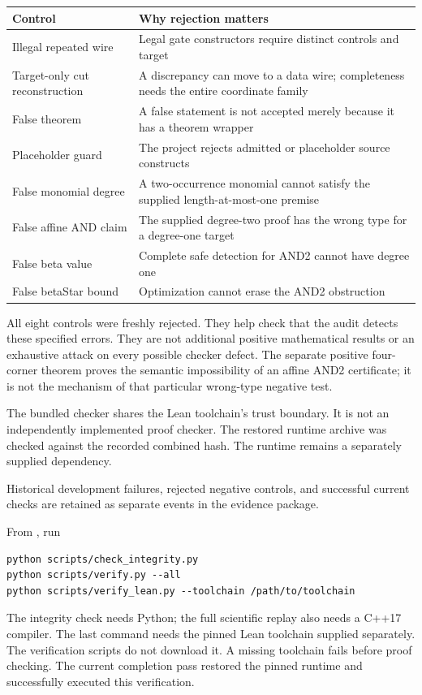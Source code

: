 \begin{tabularx}{\textwidth}{@{}>{\raggedright\arraybackslash}p{2.05in}>{\raggedright\arraybackslash}X@{}}\toprule
Control & Why rejection matters\\\midrule
Illegal repeated wire & Legal gate constructors require distinct controls and target\\
Target-only cut reconstruction & A discrepancy can move to a data wire; completeness needs the entire coordinate family\\
False theorem & A false statement is not accepted merely because it has a theorem wrapper\\
Placeholder guard & The project rejects admitted or placeholder source constructs\\
False monomial degree & A two-occurrence monomial cannot satisfy the supplied length-at-most-one premise\\
False affine AND claim & The supplied degree-two proof has the wrong type for a degree-one target\\
False beta value & Complete safe detection for AND2 cannot have degree one\\
False betaStar bound & Optimization cannot erase the AND2 obstruction\\\bottomrule
\end{tabularx}

All eight controls were freshly rejected. They help check that the audit detects these specified errors. They are not additional positive mathematical results or an exhaustive attack on every possible checker defect.
The separate positive four-corner theorem proves the semantic impossibility
of an affine AND2 certificate; it is not the mechanism of that particular
wrong-type negative test.

The bundled checker shares the Lean toolchain's trust boundary. It is not an independently implemented proof checker. The restored runtime archive was checked against the recorded combined hash. The runtime remains a separately supplied dependency.

Historical development failures, rejected negative controls, and successful current checks are retained as separate events in the evidence package.

From , run
\begin{lstlisting}
python scripts/check_integrity.py
python scripts/verify.py --all
python scripts/verify_lean.py --toolchain /path/to/toolchain
\end{lstlisting}
The integrity check needs Python; the full scientific replay also needs a
C++17 compiler. The last command needs the pinned
Lean toolchain supplied separately. The verification scripts do not download
it. A missing toolchain fails before proof checking. The current completion pass restored the pinned runtime and successfully executed this verification.


